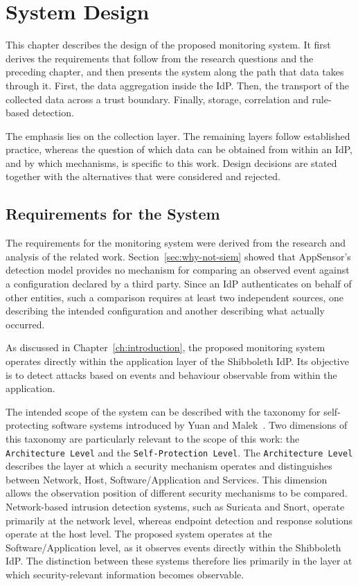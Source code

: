 \documentclass[../main.tex]{subfiles}
\begin{document}
\chapter{System Design}\label{ch:system-design}

This chapter describes the design of the proposed monitoring system. 
It first derives the requirements that follow from the research questions and the preceding chapter, 
and then presents the system along the path that data takes through it. 
First, the data aggregation inside the IdP. 
Then, the transport of the collected data across a trust boundary. 
Finally, storage, correlation and rule-based detection.

The emphasis lies on the collection layer. 
The remaining layers follow established practice, whereas the question of which data can be obtained 
from within an IdP, and by which mechanisms, is specific to this work. 
Design decisions are stated together with the alternatives that were considered and rejected.

\section{Requirements for the System}\label{sec:requirements}

The requirements for the monitoring system were derived from the research and analysis of the related work.
Section~\ref{sec:why-not-siem} showed that AppSensor's detection model provides no mechanism for 
comparing an observed event against a configuration declared by a third party. 
Since an IdP authenticates on behalf of other entities, such a comparison requires at least two independent 
sources, one describing the intended configuration and another describing what actually occurred. 

As discussed in Chapter~\ref{ch:introduction}, the proposed monitoring system operates 
directly within the application layer of the Shibboleth IdP. 
Its objective is to detect attacks based on events and behaviour observable from 
within the application. 

The intended scope of the system can be described with the taxonomy for self-protecting software 
systems introduced by Yuan and Malek~\cite{Taxonomy}. 
Two dimensions of this taxonomy are particularly relevant to the scope of this work: the 
\texttt{Architecture Level} and the \texttt{Self-Protection Level}.
The \texttt{Architecture Level} describes the layer at which a security mechanism operates and 
distinguishes between Network, Host, Software/Application and Services. 
This dimension allows the observation position of different security mechanisms to be compared. 
Network-based intrusion detection systems, such as Suricata and Snort, operate primarily at the 
network level, whereas endpoint detection and response solutions operate at the host level. 
The proposed system operates at the Software/Application level, as it observes events directly 
within the Shibboleth IdP. 
The distinction between these systems therefore lies primarily in the layer at which 
security-relevant information becomes observable. 
\end{document}
